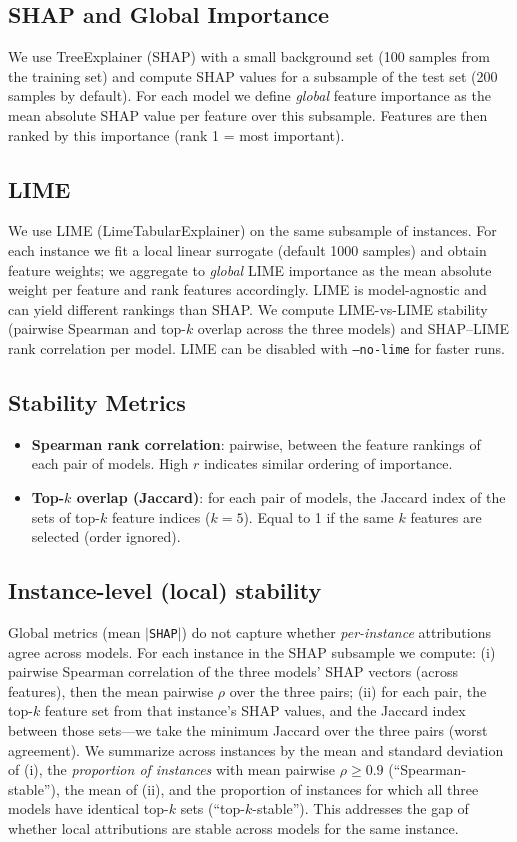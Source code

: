 \documentclass[11pt,a4paper]{article}
\begin{document}
\subsection{SHAP and Global Importance}
We use TreeExplainer (SHAP) with a small background set (100 samples from the training set) and compute SHAP values for a subsample of the test set (200 samples by default). For each model we define \emph{global} feature importance as the mean absolute SHAP value per feature over this subsample. Features are then ranked by this importance (rank 1 = most important).

\subsection{LIME}
We use LIME (LimeTabularExplainer) on the same subsample of instances. For each instance we fit a local linear surrogate (default 1000 samples) and obtain feature weights; we aggregate to \emph{global} LIME importance as the mean absolute weight per feature and rank features accordingly. LIME is model-agnostic and can yield different rankings than SHAP. We compute LIME-vs-LIME stability (pairwise Spearman and top-$k$ overlap across the three models) and SHAP--LIME rank correlation per model. LIME can be disabled with \texttt{--no-lime} for faster runs.

\subsection{Stability Metrics}
\begin{itemize}
  \item \textbf{Spearman rank correlation}: pairwise, between the feature rankings of each pair of models. High $r$ indicates similar ordering of importance.
  \item \textbf{Top-$k$ overlap (Jaccard)}: for each pair of models, the Jaccard index of the sets of top-$k$ feature indices ($k=5$). Equal to 1 if the same $k$ features are selected (order ignored).
\end{itemize}

\subsection{Instance-level (local) stability}
Global metrics (mean $|$\texttt{SHAP}$|$) do not capture whether \emph{per-instance} attributions agree across models. For each instance in the SHAP subsample we compute: (i) pairwise Spearman correlation of the three models' SHAP vectors (across features), then the mean pairwise $\rho$ over the three pairs; (ii) for each pair, the top-$k$ feature set from that instance's SHAP values, and the Jaccard index between those sets---we take the minimum Jaccard over the three pairs (worst agreement). We summarize across instances by the mean and standard deviation of (i), the \emph{proportion of instances} with mean pairwise $\rho \geq 0.9$ (``Spearman-stable''), the mean of (ii), and the proportion of instances for which all three models have identical top-$k$ sets (``top-$k$-stable''). This addresses the gap of whether local attributions are stable across models for the same instance.
\end{document}
